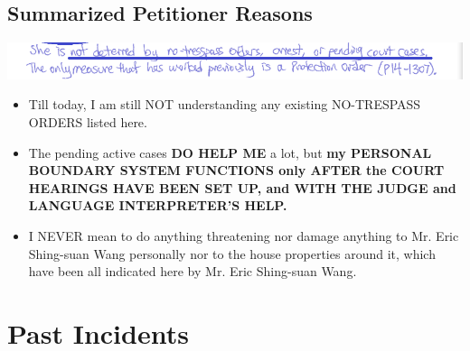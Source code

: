 \documentclass[9pt, b5paper]{article}
\begin{document}
\subsection{Summarized Petitioner Reasons}
\label{sec-4-5}

\includegraphics[width=.9\linewidth]{./pic/dearCousin_20220920_142922.png}
\begin{itemize}
\item Till today, I am still NOT understanding any existing NO-TRESPASS ORDERS listed here.
\item The pending active cases \textbf{DO HELP ME} a lot, but \textbf{my PERSONAL BOUNDARY SYSTEM FUNCTIONS only AFTER the COURT HEARINGS HAVE BEEN SET UP, and WITH THE JUDGE and LANGUAGE INTERPRETER'S HELP.}
\item I NEVER mean to do anything threatening nor damage anything to Mr. Eric Shing-suan Wang personally nor to the house properties around it, which have been all indicated here by Mr. Eric Shing-suan Wang.
\end{itemize}

\section{Past Incidents}
\label{sec-5}
\end{document}
